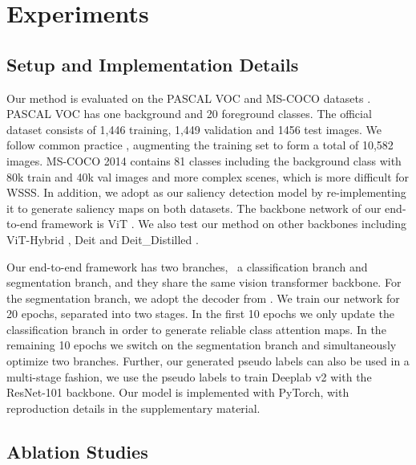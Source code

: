 \documentclass[10pt,twocolumn,letterpaper]{article}
\begin{document}
\section{Experiments}
\subsection{Setup and Implementation Details}
Our method is evaluated on the PASCAL VOC \cite{everingham2010pascal} and MS-COCO datasets \cite{lin2014microsoft}.
PASCAL VOC \cite{everingham2010pascal} has one background and 20 foreground classes. The official dataset consists of 1,446 
training, 1,449 validation and 1456 test images.
We follow common practice \cite{hariharan2011semantic}, augmenting the training set to form a total of 10,582 images.
MS-COCO 2014 \cite{lin2014microsoft} contains 81 classes including the background class with 80k train and 40k val images and more complex scenes, which is more difficult for WSSS.
In addition, we adopt \cite{mao2021transformer} as our saliency detection model by re-implementing it to generate saliency maps on both datasets.
The backbone network of our end-to-end framework is ViT \cite{dosovitskiy2020image} 
. 
We also test our method on other backbones including ViT-Hybrid \cite{dosovitskiy2020image}, Deit \cite{touvron2021training} and Deit\_Distilled \cite{touvron2021training}.




Our end-to-end framework has two branches, \ie~a classification branch and segmentation branch, and they share the same vision transformer backbone.
For the segmentation branch, we adopt the decoder from
\cite{ranftl2021vision}.
We train our network for 20 epochs, separated into two stages.
In the first 10 epochs we only update the classification branch in order to generate reliable class attention maps.
In the remaining 10 epochs we switch on the segmentation branch and simultaneously optimize two branches.  
Further, our generated pseudo labels can also be used in a multi-stage fashion, we use the pseudo labels to train Deeplab v2 \cite{chen2017deeplab} with the ResNet-101 backbone.
Our model is implemented with PyTorch, with reproduction details in the supplementary material.




\subsection{Ablation Studies}
\end{document}

